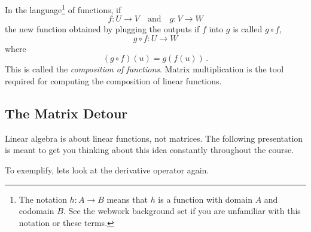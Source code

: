 In the language\footnote{The notation $h:A\to B$ means that $h$ is a function with domain $A$ and codomain $B$. See the webwork  background  set if you are unfamiliar with this notation or these terms.} 
of functions, if \[f:U\longrightarrow V\quad \mbox{and}\quad g:V\longrightarrow W\]
the new function obtained by plugging the outputs if $f$ into $g$ is called $g\circ f$,
\[
g\circ f:
U\longrightarrow  W\]
where
\[
(g\circ f)(u)=g(f(u))\, .
\]
This is called the {\itshape composition of functions}.
Matrix multiplication is the tool required for computing the composition of linear functions.


\subsection{The Matrix Detour}
Linear algebra is about linear functions, not matrices. 
The following presentation is meant to get you thinking about this idea constantly throughout the course.
\begin{center}
\end{center}
To exemplify, lets look at the derivative operator again.

